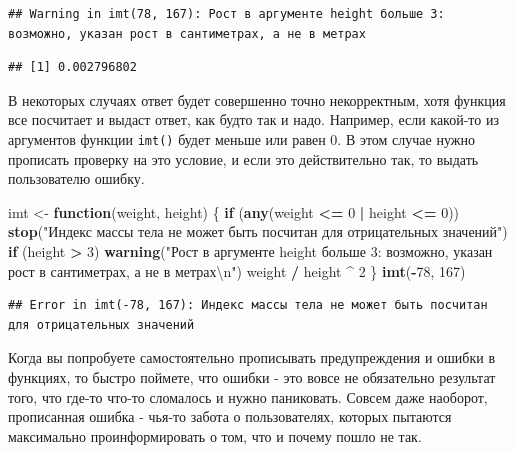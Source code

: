 \documentclass[]{book}
\newenvironment{Shaded}{\begin{snugshade}}{\end{snugshade}}
\newcommand{\KeywordTok}[1]{\textcolor[rgb]{0.13,0.29,0.53}{\textbf{#1}}}
\newcommand{\DecValTok}[1]{\textcolor[rgb]{0.00,0.00,0.81}{#1}}
\newcommand{\CharTok}[1]{\textcolor[rgb]{0.31,0.60,0.02}{#1}}
\newcommand{\StringTok}[1]{\textcolor[rgb]{0.31,0.60,0.02}{#1}}
\newcommand{\ControlFlowTok}[1]{\textcolor[rgb]{0.13,0.29,0.53}{\textbf{#1}}}
\newcommand{\OperatorTok}[1]{\textcolor[rgb]{0.81,0.36,0.00}{\textbf{#1}}}
\newcommand{\NormalTok}[1]{#1}
\begin{document}
\begin{verbatim}
## Warning in imt(78, 167): Рост в аргументе height больше 3: возможно, указан рост в сантиметрах, а не в метрах
\end{verbatim}

\begin{verbatim}
## [1] 0.002796802
\end{verbatim}

В некоторых случаях ответ будет совершенно точно некорректным, хотя
функция все посчитает и выдаст ответ, как будто так и надо. Например,
если какой-то из аргументов функции \texttt{imt()} будет меньше или
равен 0. В этом случае нужно прописать проверку на это условие, и если
это действительно так, то выдать пользователю ошибку.

\begin{Shaded}
\begin{Highlighting}[]
\NormalTok{imt <-}\StringTok{ }\ControlFlowTok{function}\NormalTok{(weight, height) \{}
  \ControlFlowTok{if}\NormalTok{ (}\KeywordTok{any}\NormalTok{(weight }\OperatorTok{<=}\StringTok{ }\DecValTok{0} \OperatorTok{|}\StringTok{ }\NormalTok{height }\OperatorTok{<=}\StringTok{ }\DecValTok{0}\NormalTok{)) }\KeywordTok{stop}\NormalTok{(}\StringTok{"Индекс массы тела не может быть посчитан для отрицательных значений"}\NormalTok{)}
  \ControlFlowTok{if}\NormalTok{ (height }\OperatorTok{>}\StringTok{ }\DecValTok{3}\NormalTok{) }\KeywordTok{warning}\NormalTok{(}\StringTok{"Рост в аргументе height больше 3: возможно, указан рост в сантиметрах, а не в метрах}\CharTok{\textbackslash{}n}\StringTok{"}\NormalTok{)}
\NormalTok{  weight }\OperatorTok{/}\StringTok{ }\NormalTok{height }\OperatorTok{^}\StringTok{ }\DecValTok{2}
\NormalTok{\}}
\KeywordTok{imt}\NormalTok{(}\OperatorTok{-}\DecValTok{78}\NormalTok{, }\DecValTok{167}\NormalTok{)}
\end{Highlighting}
\end{Shaded}

\begin{verbatim}
## Error in imt(-78, 167): Индекс массы тела не может быть посчитан для отрицательных значений
\end{verbatim}

Когда вы попробуете самостоятельно прописывать предупреждения и ошибки в
функциях, то быстро поймете, что ошибки - это вовсе не обязательно
результат того, что где-то что-то сломалось и нужно паниковать. Совсем
даже наоборот, прописанная ошибка - чья-то забота о пользователях,
которых пытаются максимально проинформировать о том, что и почему пошло
не так.
\end{document}
